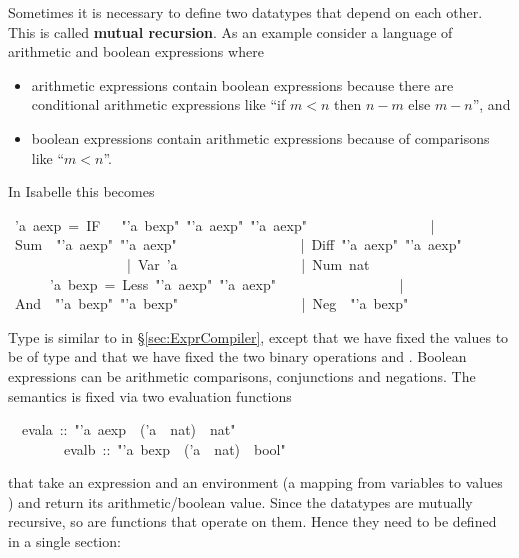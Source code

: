 \begin{isabelle}%
%
\begin{isamarkuptext}%
Sometimes it is necessary to define two datatypes that depend on each
other. This is called \textbf{mutual recursion}. As an example consider a
language of arithmetic and boolean expressions where
\begin{itemize}
\item arithmetic expressions contain boolean expressions because there are
  conditional arithmetic expressions like ``if $m<n$ then $n-m$ else $m-n$'',
  and
\item boolean expressions contain arithmetic expressions because of
  comparisons like ``$m<n$''.
\end{itemize}
In Isabelle this becomes%
\end{isamarkuptext}%
\ 'a\ aexp\ =\ IF\ \ \ {"}'a\ bexp{"}\ {"}'a\ aexp{"}\ {"}'a\ aexp{"}\isanewline
\ \ \ \ \ \ \ \ \ \ \ \ \ \ \ \ \ |\ Sum\ \ {"}'a\ aexp{"}\ {"}'a\ aexp{"}\isanewline
\ \ \ \ \ \ \ \ \ \ \ \ \ \ \ \ \ |\ Diff\ {"}'a\ aexp{"}\ {"}'a\ aexp{"}\isanewline
\ \ \ \ \ \ \ \ \ \ \ \ \ \ \ \ \ |\ Var\ 'a\isanewline
\ \ \ \ \ \ \ \ \ \ \ \ \ \ \ \ \ |\ Num\ nat\isanewline
{}\ \ \ \ \ \ 'a\ bexp\ =\ Less\ {"}'a\ aexp{"}\ {"}'a\ aexp{"}\isanewline
\ \ \ \ \ \ \ \ \ \ \ \ \ \ \ \ \ |\ And\ \ {"}'a\ bexp{"}\ {"}'a\ bexp{"}\isanewline
\ \ \ \ \ \ \ \ \ \ \ \ \ \ \ \ \ |\ Neg\ \ {"}'a\ bexp{"}%
\begin{isamarkuptext}%
\noindent
Type  is similar to  in \S\ref{sec:ExprCompiler},
except that we have fixed the values to be of type  and that we
have fixed the two binary operations  and . Boolean
expressions can be arithmetic comparisons, conjunctions and negations.
The semantics is fixed via two evaluation functions%
\end{isamarkuptext}%
\ \ evala\ ::\ {"}'a\ aexp\ {\isasymRightarrow}\ ('a\ {\isasymRightarrow}\ nat)\ {\isasymRightarrow}\ nat{"}\isanewline
\ \ \ \ \ \ \ \ evalb\ ::\ {"}'a\ bexp\ {\isasymRightarrow}\ ('a\ {\isasymRightarrow}\ nat)\ {\isasymRightarrow}\ bool{"}%
\begin{isamarkuptext}%
\noindent
that take an expression and an environment (a mapping from variables  to values
) and return its arithmetic/boolean
value. Since the datatypes are mutually recursive, so are functions that
operate on them. Hence they need to be defined in a single 
section:%
\end{isamarkuptext}%

\end{isabelle}
